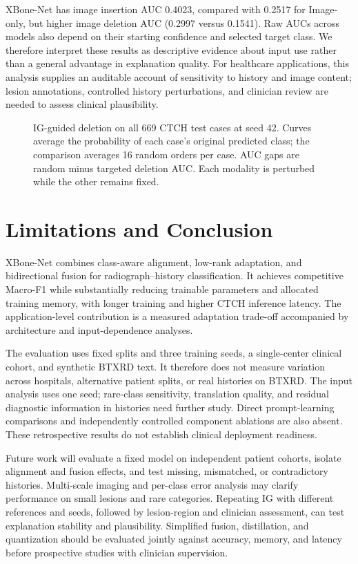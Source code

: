\documentclass[conference,a4paper]{IEEEtran}
\begin{document}
XBone-Net has image insertion AUC 0.4023, compared with 0.2517 for Image-only, but higher image deletion AUC (0.2997 versus 0.1541). Raw AUCs across models also depend on their starting confidence and selected target class. We therefore interpret these results as descriptive evidence about input use rather than a general advantage in explanation quality. For healthcare applications, this analysis supplies an auditable account of sensitivity to history and image content; lesion annotations, controlled history perturbations, and clinician review are needed to assess clinical plausibility.

\begin{figure}[t]
\centering

\caption{IG-guided deletion on all 669 CTCH test cases at seed 42. Curves average the probability of each case's original predicted class; the comparison averages 16 random orders per case. AUC gaps are random minus targeted deletion AUC. Each modality is perturbed while the other remains fixed.}
\label{fig:ig}
\end{figure}

\section{Limitations and Conclusion}
XBone-Net combines class-aware alignment, low-rank adaptation, and bidirectional fusion for radiograph--history classification. It achieves competitive Macro-F1 while substantially reducing trainable parameters and allocated training memory, with longer training and higher CTCH inference latency. The application-level contribution is a measured adaptation trade-off accompanied by architecture and input-dependence analyses.

The evaluation uses fixed splits and three training seeds, a single-center clinical cohort, and synthetic BTXRD text. It therefore does not measure variation across hospitals, alternative patient splits, or real histories on BTXRD. The input analysis uses one seed; rare-class sensitivity, translation quality, and residual diagnostic information in histories need further study. Direct prompt-learning comparisons and independently controlled component ablations are also absent. These retrospective results do not establish clinical deployment readiness.

Future work will evaluate a fixed model on independent patient cohorts, isolate alignment and fusion effects, and test missing, mismatched, or contradictory histories. Multi-scale imaging and per-class error analysis may clarify performance on small lesions and rare categories. Repeating IG with different references and seeds, followed by lesion-region and clinician assessment, can test explanation stability and plausibility. Simplified fusion, distillation, and quantization should be evaluated jointly against accuracy, memory, and latency before prospective studies with clinician supervision.
\end{document}
